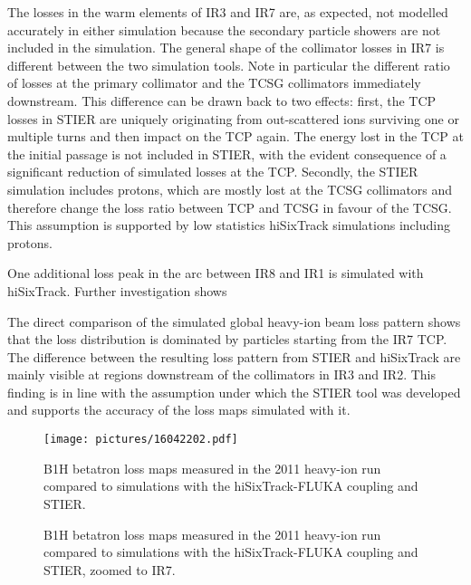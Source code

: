 The losses in the warm elements of IR3 and IR7 are, as expected, not modelled accurately in either simulation because the secondary particle showers are not included in the simulation. The general shape of the collimator losses in IR7 is different between the two simulation tools. Note in particular the different ratio of losses at the primary collimator and the TCSG collimators immediately downstream. This difference can be drawn back to two effects: first, the TCP losses in STIER are uniquely originating from out-scattered \lead ions surviving one or multiple turns and then impact on the TCP again. The energy lost in the TCP at the initial passage is not included in STIER, with the evident consequence of a significant reduction of simulated losses at the TCP. Secondly, the STIER simulation includes protons, which are mostly lost at the TCSG collimators and therefore change the loss ratio between TCP and TCSG in favour of the TCSG. This assumption is supported by low statistics hiSixTrack simulations including protons. 

One additional loss peak in the arc between IR8 and IR1 is simulated with hiSixTrack. Further investigation shows 


The direct comparison of the simulated global heavy-ion beam loss pattern shows that the loss distribution is dominated by particles starting from the IR7 TCP. The difference between the resulting loss pattern from STIER and hiSixTrack are mainly visible at regions downstream of the collimators in IR3 and IR2. This finding is in line with the assumption under which the STIER tool was developed and supports the accuracy of the loss maps simulated with it. 

\begin{figure}[t]  
    \centering
    \texttt{[image: pictures/16042202.pdf]}
    \caption{B1H betatron loss maps measured in the 2011 heavy-ion run compared to simulations with the hiSixTrack-FLUKA coupling and STIER.}  
    \label{pic:16042202}
\end{figure}


\begin{figure}[t]
  \centering
  \caption{B1H betatron loss maps measured in the 2011 heavy-ion run compared to simulations with the hiSixTrack-FLUKA coupling and STIER, zoomed to IR7.}  
  \label{pic:16070803}
  \end{figure}


